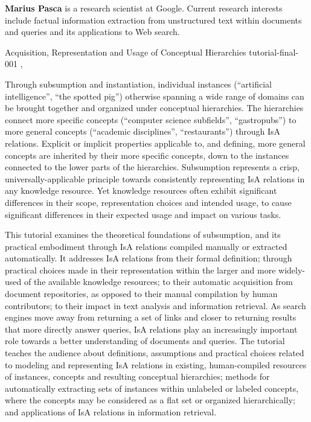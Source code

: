 \begin{bio}
  {\bfseries Marius Pasca}  is a research scientist at Google. Current research interests include factual information extraction from unstructured text within documents and queries and its applications to Web search.
  
\end{bio}

\begin{tutorial}
  {Acquisition, Representation and Usage of Conceptual Hierarchies}
  {tutorial-final-001}
  {\daydateyear, \tutorialmorningtime}
  {\TutLocA}

Through subsumption and instantiation, individual instances (“artificial intelligence”, “the spotted pig”) otherwise spanning a wide range of domains can be brought together and organized under conceptual hierarchies. The hierarchies connect more specific concepts (“computer science subfields”, “gastropubs”) to more general concepts (“academic disciplines”, “restaurants”) through IsA relations. Explicit or implicit properties applicable to, and defining, more general concepts are inherited by their more specific concepts, down to the instances connected to the lower parts of the hierarchies. Subsumption represents a crisp, universally-applicable principle towards consistently representing IsA relations in any knowledge resource. Yet knowledge resources often exhibit significant differences in their scope, representation choices and intended usage, to cause significant differences in their expected usage and impact on various tasks.

This tutorial examines the theoretical foundations of subsumption, and its practical embodiment through IsA relations compiled manually or extracted automatically. It addresses IsA relations from their formal definition; through practical choices made in their representation within the larger and more widely-used of the available knowledge resources; to their automatic acquisition from document repositories, as opposed to their manual compilation by human contributors; to their impact in text analysis and information retrieval. As search engines move away from returning a set of links and closer to returning results that more directly answer queries, IsA relations play an increasingly important role towards a better understanding of documents and queries. The tutorial teaches the audience about definitions, assumptions and practical choices related to modeling and representing IsA relations in existing, human-compiled resources of instances, concepts and resulting conceptual hierarchies; methods for automatically extracting sets of instances within unlabeled or labeled concepts, where the concepts may be considered as a flat set or organized hierarchically; and applications of IsA relations in information retrieval.

\end{tutorial}
